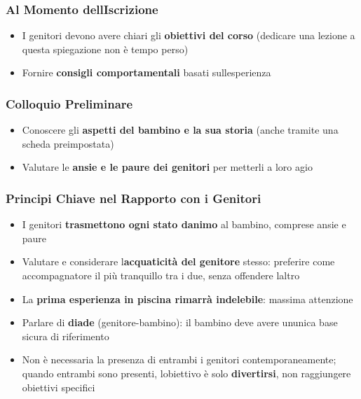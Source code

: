 \documentclass[a4paper,11pt]{article}
\providecommand{\tightlist}{%
  \setlength{\itemsep}{0pt}\setlength{\parskip}{0pt}}
\begin{document}
\subsubsection{Al Momento
      dell\textquotesingle Iscrizione}\label{al-momento-delliscrizione}

\begin{itemize}
      \tightlist
      \item
            I genitori devono avere chiari gli \textbf{obiettivi del corso}
            (dedicare una lezione a questa spiegazione non è tempo perso)
      \item
            Fornire \textbf{consigli comportamentali} basati
            sull\textquotesingle esperienza
\end{itemize}

\subsubsection{Colloquio Preliminare}\label{colloquio-preliminare}

\begin{itemize}
      \tightlist
      \item
            Conoscere gli \textbf{aspetti del bambino e la sua storia} (anche
            tramite una scheda preimpostata)
      \item
            Valutare le \textbf{ansie e le paure dei genitori} per metterli a loro
            agio
\end{itemize}

\subsubsection{Principi Chiave nel Rapporto con i
      Genitori}\label{principi-chiave-nel-rapporto-con-i-genitori}

\begin{itemize}
      \tightlist
      \item
            I genitori \textbf{trasmettono ogni stato d\textquotesingle animo} al
            bambino, comprese ansie e paure
      \item
            Valutare e considerare l\textquotesingle{}\textbf{acquaticità del
                  genitore} stesso: preferire come accompagnatore il più tranquillo tra
            i due, senza offendere l\textquotesingle altro
      \item
            La \textbf{prima esperienza in piscina rimarrà indelebile}: massima
            attenzione
      \item
            Parlare di \textbf{diade} (genitore-bambino): il bambino deve avere
            un\textquotesingle unica base sicura di riferimento
      \item
            Non è necessaria la presenza di entrambi i genitori
            contemporaneamente; quando entrambi sono presenti,
            l\textquotesingle obiettivo è solo \textbf{divertirsi}, non
            raggiungere obiettivi specifici
\end{itemize}
\end{document}
